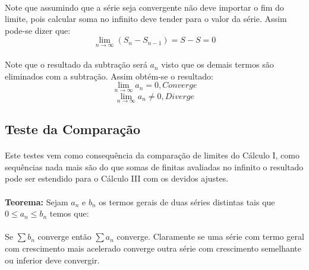 \documentclass{article}
\begin{document}
            \paragraph{}Note que assumindo que a série seja convergente não deve importar o fim do limite, pois calcular soma no infinito deve tender para o valor da série. Assim pode-se dizer que:
                \begin{equation}
                    \lim_{n\to\infty}(S_{n}-S_{n-1}) = S - S = 0
                \end{equation}
            \paragraph{}Note que o resultado da subtração será $a_{n}$ visto que os demais termos são eliminados com a subtração. Assim obtém-se o resultado:
                \begin{equation}
                    \lim_{n\to\infty}a_{n} = 0, Converge
                \end{equation}
                \begin{equation}
                    \lim_{n\to\infty}a_{n} \ne 0, Diverge
                \end{equation}
        
        \subsection{Teste da Comparação}
            \paragraph{}Este testes vem como consequência da comparação de limites do Cálculo I, como sequências nada mais são do que somas de finitas avaliadas no infinito o resultado pode ser estendido para o Cálculo III com os devidos ajustes.
            \paragraph{}\textbf{Teorema:} Sejam $a_{n}$ e $b_{n}$ os termos gerais de duas séries distintas tais que $0 \le a_{n} \le b_{n}$ temos que:
            \paragraph{}Se $\sum b_{n}$ converge então $\sum a_{n}$ converge. Claramente se uma série com termo geral com crescimento mais acelerado converge outra série com crescimento semelhante ou inferior deve convergir.
\end{document}
